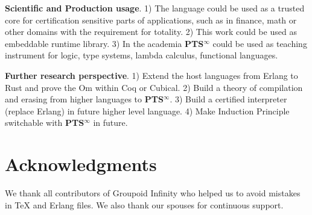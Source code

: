 \documentclass{aip-cp}
\begin{document}
{\bf Scientific and Production usage}.
1) The language could be used as a trusted core for certification sensitive parts of applications,
such as in finance, math or other domains with the requirement for totality.
2) This work could be used as embeddable runtime library.
3) In the academia {\bf PTS$^\infty$} could be used as teaching instrument for logic,
type systems, lambda calculus, functional languages.

{\bf Further research perspective}.
1) Extend the host languages from Erlang to Rust and prove the Om within Coq or Cubical.
2) Build a theory of compilation and erasing from higher languages to {\bf PTS$^\infty$}.
3) Build a certified interpreter (replace Erlang) in future higher level language.
4) Make Induction Principle switchable with {\bf PTS$^\infty$} in future.

\section{Acknowledgments}
We thank all contributors of Groupoid Infinity who helped us to avoid mistakes
in TeX and Erlang files. We also thank our spouses for continuous support.



\newpage
\tableofcontents
\end{document}
